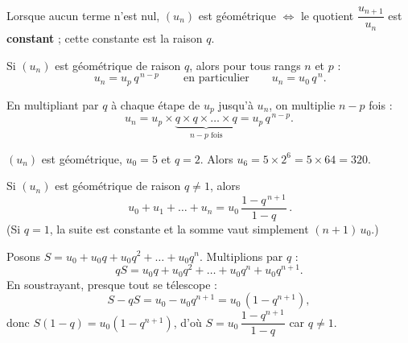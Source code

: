 \begin{aretenir}
Lorsque aucun terme n'est nul, $(u_n)$ est géométrique $\iff$ le quotient
$\dfrac{u_{n+1}}{u_n}$ est \textbf{constant} ; cette constante est la raison $q$.
\end{aretenir}

\begin{theoreme}
Si $(u_n)$ est géométrique de raison $q$, alors pour tous rangs $n$ et $p$ :
\[ \boxed{\,u_n = u_p\,q^{\,n-p}\,}\qquad\text{en particulier}\qquad u_n=u_0\,q^{\,n}. \]
\end{theoreme}

\begin{exemple}[Démonstration]
En multipliant par $q$ à chaque étape de $u_p$ jusqu'à $u_n$, on multiplie $n-p$ fois :
\[ u_n=u_p\times\underbrace{q\times q\times\dots\times q}_{n-p \text{ fois}}=u_p\,q^{\,n-p}. \]
\end{exemple}

\begin{exemple}
$(u_n)$ est géométrique, $u_0=5$ et $q=2$. Alors $u_6=5\times 2^6=5\times 64=320$.
\end{exemple}

\begin{theoreme}
Si $(u_n)$ est géométrique de raison $q\neq 1$, alors
\[ \boxed{\,u_0+u_1+\dots+u_n=u_0\,\dfrac{1-q^{\,n+1}}{1-q}\,}. \]
(Si $q=1$, la suite est constante et la somme vaut simplement $(n+1)\,u_0$.)
\end{theoreme}

\begin{exemple}[Démonstration]
Posons $S=u_0+u_0q+u_0q^2+\dots+u_0q^{n}$. Multiplions par $q$ :
\[ qS=u_0q+u_0q^2+\dots+u_0q^{n}+u_0q^{n+1}. \]
En soustrayant, presque tout se télescope :
\[ S-qS=u_0-u_0q^{n+1}=u_0\,(1-q^{n+1}), \]
donc $S(1-q)=u_0(1-q^{n+1})$, d'où $S=u_0\,\dfrac{1-q^{n+1}}{1-q}$ car $q\neq 1$.
\end{exemple}

\begin{illus}
\end{illus}

